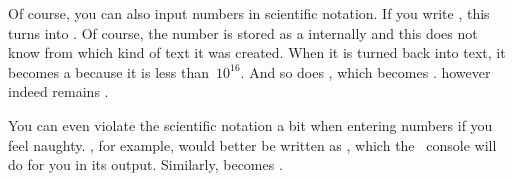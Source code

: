 Of course, you can also input numbers in scientific notation.
If you write , this turns into .
Of course, the number is stored as a  internally and this  does not know from which kind of text it was created.
When it is turned back into text, it becomes a  because it is less than~$10^{16}$.
And so does , which becomes .
 however indeed remains .

You can even violate the scientific notation a bit when entering numbers if you feel naughty.
, for example, would better be written as , which the \python\ console will do for you in its output.
Similarly,  becomes .
\endhsection%
%
\endhsection%
%
